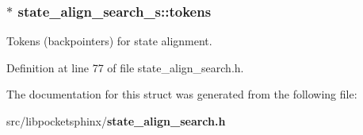 \subsubsection[{tokens}]{$\ast$ state\-\_\-align\-\_\-search\-\_\-s\-::tokens}\label{structstate__align__search__s_a2fae207533462fe6efe19c8a2a3a64e0}


Tokens (backpointers) for state alignment. 



Definition at line 77 of file state\-\_\-align\-\_\-search.\-h.



The documentation for this struct was generated from the following file\-:\begin{DoxyCompactItemize}
\item 
src/libpocketsphinx/{\bf state\-\_\-align\-\_\-search.\-h}\end{DoxyCompactItemize}
